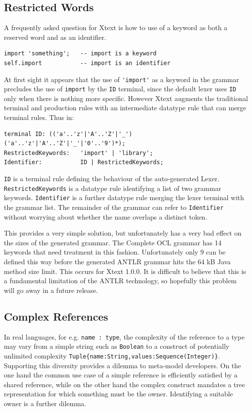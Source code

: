 \documentclass[runningheads,a4paper]{llncs}
\begin{document}
\subsection{Restricted Words}

A frequently asked question for Xtext is how to use of a keyword as both a reserved word and as an identifier. 

{\small\begin{verbatim}
import 'something';   -- import is a keyword
self.import           -- import is an identifier
\end{verbatim}}

At first sight it appears that the use of \verb+'import'+ as a keyword in the grammar precludes the use of \verb+import+ by the \verb+ID+ terminal, since the default lexer uses \verb+ID+ only when there is nothing more specific. However Xtext augments the traditional terminal and production rules with an intermediate datatype rule that can merge terminal rules. Thus in:

{\small\begin{verbatim}
terminal ID: (('a'..'z'|'A'..'Z'|'_') ('a'..'z'|'A'..'Z'|'_'|'0'..'9')*);
RestrictedKeywords:   'import' | 'library';
Identifier:           ID | RestrictedKeywords;
\end{verbatim}}
 
\verb+ID+ is a terminal rule defining the behaviour of the auto-generated Lexer. 
\verb+RestrictedKeywords+ is a datatype rule identifying a list of two grammar keywords.
\verb+Identifier+ is a further datatype rule merging the lexer terminal with the grammar list.
The remainder of the grammar can refer to \verb+Identifier+ without worrying about whether the name overlaps a distinct token.

This provides a very simple solution, but unfortunately has a very bad effect on the sizes of the generated grammar. The Complete OCL grammar has 14 keywords that need treatment in this fashion. Unfortunately only 9 can be defined this way before the generated ANTLR grammar hits the 64 kB Java method size limit. This occurs for Xtext 1.0.0. It is difficult to believe that this is a fundamental limitation of the ANTLR technology, so hopefully this problem will go away in a future release.

\subsection{Complex References}

In real languages, for e.g. \verb+name : type+, the complexity of the reference to a type may vary from a simple string such as \verb+Boolean+ to a construct of potentially unlimited complexity \verb+Tuple{name:String,values:Sequence(Integer)}+. Supporting this diversity provides a dilemma to meta-model developers. On the one hand the common use case of a simple reference is efficiently satisfied by a shared reference, while on the other hand the complex construct mandates a tree representation for which something must be the owner. Identifying a suitable owner is a further dilemma.
\end{document}
